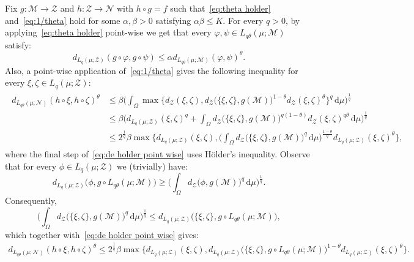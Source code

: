 \documentclass[11pt,reqno]{amsart}
\renewcommand{\le}{\leqslant}
\renewcommand{\ge}{\geqslant}
\newcommand{\cZ}{\mathcal{Z}}
\newcommand{\NN}{\mathcal{N}}
\newcommand{\MM}{\mathcal{M}}
\newcommand{\f}{\varphi}
\newcommand{\ud}[0]{\,\mathrm{d}}
\begin{document}
Fix $g:\MM\to \cZ$ and $h:\cZ\to \NN$ with $h\circ g=f$ such that~\eqref{eq:theta holder} and~\eqref{eq:1/theta} hold for some $\alpha,\beta>0$ satisfying $\alpha\beta\le K$. For every $q>0$, by applying~\eqref{eq:theta holder}  point-wise we get that every $\f,\psi\in L_{q\theta}(\mu;\MM)$ satisfy:
\begin{equation}\label{eq:lifted G}
 d_{L_{q}(\mu;\cZ)}(g\circ \f,g\circ \psi) \le \alpha d_{L_{q\theta}(\mu;\MM)}( \f, \psi)^\theta.  
\end{equation}
Also, a point-wise application of~\eqref{eq:1/theta} gives the following inequality for every $\xi,\zeta\in L_q(\mu;\cZ)$:
\begin{align}\label{eq:de holder point wise}
\begin{split}
d_{L_{q\theta}(\mu;\NN)}(h\circ \xi,h\circ \zeta)^\theta&\le \beta\Big(\int_\Omega \max \big\{d_\cZ(\xi,\zeta),  d_\cZ\big(\{\xi,\zeta\},g(\MM)\big)^{1-\theta}d_\cZ(\xi,\zeta)^\theta\big\}^q\ud \mu\Big)^{\frac{1}{q}}\\&
\le 
\beta \Big(d_{L_q(\mu;\cZ)}(\xi,\zeta)^q+ \int_{\Omega} d_\cZ\big(\{\xi,\zeta\},g(\MM)\big)^{q(1-\theta)}d_\cZ(\xi,\zeta)^{q\theta}\ud \mu\Big)^{\frac{1}{q}}\\
&\le 2^{\frac{1}{q}} \beta\max \bigg\{d_{L_q(\mu;\cZ)}(\xi,\zeta),\Big(\int_{\Omega} d_\cZ\big(\{\xi,\zeta\},g(\MM)\big)^{q}\ud
 \mu\Big)^{\frac{1-\theta}{q}}d_{L_q(\mu;\cZ)}(\xi,\zeta)^\theta\bigg\},
 \end{split}
\end{align}
where the final step of~\eqref{eq:de holder point wise} uses H\"older's inequality. Observe that for every $\phi\in L_{q}(\mu;\cZ)$ we (trivially) have:
$$
d_{L_q(\mu;\cZ)}\big(\phi,g\circ L_{q\theta}(\mu;\MM)\big)\ge \Big(\int_{\Omega} d_\cZ\big(\phi,g(\MM)\big)^{q}\ud
 \mu\Big)^{\frac{1}{q}}.
$$
Consequently,
 $$
 \Big(\int_{\Omega} d_\cZ\big(\{\xi,\zeta\},g(\MM)\big)^{q}\ud
 \mu\Big)^{\frac{1}{q}}\le d_{L_q(\mu;\cZ)}\big(\{\xi,\zeta\},g\circ L_{q\theta}(\mu;\MM)\big),
$$
which together with~\eqref{eq:de holder point wise} gives:
\begin{align}\label{eq:after holder}
d_{L_{q\theta}(\mu;\NN)}(h\circ \xi,h\circ \zeta)^\theta\le 
 2^{\frac{1}{q}}\beta\max \bigg\{d_{L_q(\mu;\cZ)}(\xi,\zeta),d_{L_q(\mu;\cZ)}\big(\{\xi,\zeta\},g\circ L_{q\theta}(\mu;\MM)\big)^{1-\theta}d_{L_q(\mu;\cZ)}(\xi,\zeta)^\theta\bigg\}.
\end{align}
\end{document}
